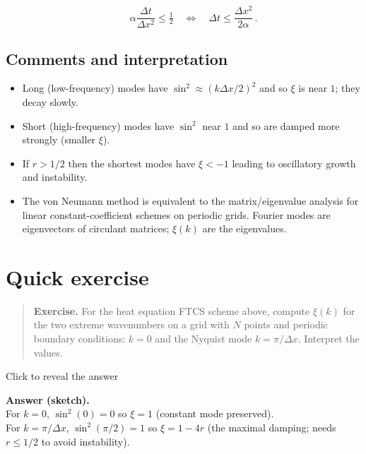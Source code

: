 \documentclass[
  letterpaper,
]{book}
\providecommand{\tightlist}{%
  \setlength{\itemsep}{0pt}\setlength{\parskip}{0pt}}
\begin{document}
\[
\boxed{\qquad \alpha\frac{\Delta t}{\Delta x^2} \le \tfrac12 \quad\Longleftrightarrow\quad \Delta t \le \frac{\Delta x^2}{2\alpha}\,.}
\]

\section{Comments and interpretation}\label{comments-and-interpretation}

\begin{itemize}
\tightlist
\item
  Long (low-frequency) modes have \(\sin^2\!\approx (k\Delta x/2)^2\)
  and so \(\xi\) is near \(1\); they decay slowly.\\
\item
  Short (high-frequency) modes have \(\sin^2\) near \(1\) and so are
  damped more strongly (smaller \(\xi\)).\\
\item
  If \(r>1/2\) then the shortest modes have \(\xi<-1\) leading to
  oscillatory growth and instability.\\
\item
  The von Neumann method is equivalent to the matrix/eigenvalue analysis
  for linear constant-coefficient schemes on periodic grids. Fourier
  modes are eigenvectors of circulant matrices; \(\xi(k)\) are the
  eigenvalues.
\end{itemize}


\chapter{Quick exercise}\label{quick-exercise}

\begin{quote}
\textbf{Exercise.} For the heat equation FTCS scheme above, compute
\(\xi(k)\) for the two extreme wavenumbers on a grid with \(N\) points
and periodic boundary conditions: \(k=0\) and the Nyquist mode
\(k=\pi/\Delta x\). Interpret the values.
\end{quote}

Click to reveal the answer

\textbf{Answer (sketch).}\\
For \(k=0\), \(\sin^2(0)=0\) so \(\xi=1\) (constant mode preserved).\\
For \(k=\pi/\Delta x\), \(\sin^2(\pi/2)=1\) so \(\xi=1-4r\) (the maximal
damping; needs \(r\le 1/2\) to avoid instability).
\end{document}
